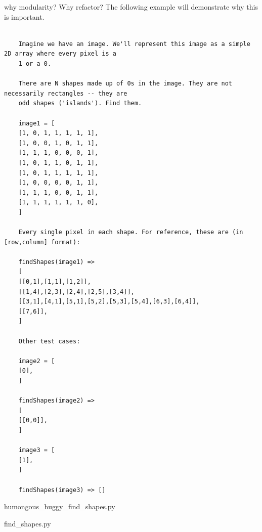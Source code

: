 why modularity?
Why refactor?
The following example will demonstrate why this is important.
\begin{verbatim}

    Imagine we have an image. We'll represent this image as a simple 2D array where every pixel is a
    1 or a 0.

    There are N shapes made up of 0s in the image. They are not necessarily rectangles -- they are
    odd shapes ('islands'). Find them.

    image1 = [
    [1, 0, 1, 1, 1, 1, 1],
    [1, 0, 0, 1, 0, 1, 1],
    [1, 1, 1, 0, 0, 0, 1],
    [1, 0, 1, 1, 0, 1, 1],
    [1, 0, 1, 1, 1, 1, 1],
    [1, 0, 0, 0, 0, 1, 1],
    [1, 1, 1, 0, 0, 1, 1],
    [1, 1, 1, 1, 1, 1, 0],
    ]

    Every single pixel in each shape. For reference, these are (in [row,column] format):

    findShapes(image1) =>
    [
    [[0,1],[1,1],[1,2]],
    [[1,4],[2,3],[2,4],[2,5],[3,4]],
    [[3,1],[4,1],[5,1],[5,2],[5,3],[5,4],[6,3],[6,4]],
    [[7,6]],
    ]

    Other test cases:

    image2 = [
    [0],
    ]

    findShapes(image2) =>
    [
    [[0,0]],
    ]

    image3 = [
    [1],
    ]

    findShapes(image3) => []
\end{verbatim}

\begin{clisting}
    
    {humongous_buggy_find_shapes.py}
    
    {find_shapes.py}
    \caption{Find connected shapes problem.}
\end{clisting}
